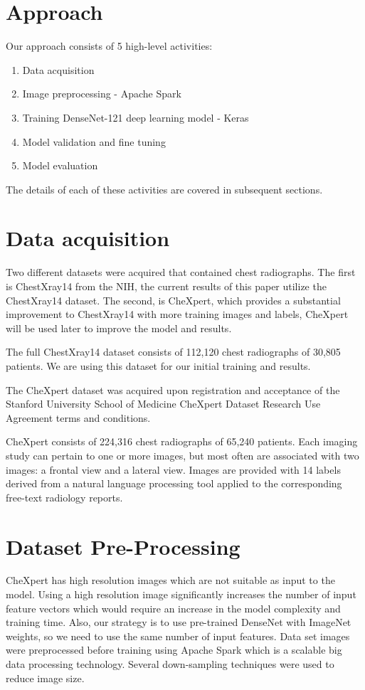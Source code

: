 \documentclass{amia}
\begin{document}
\section*{Approach}

Our approach consists of 5 high-level activities:
\begin{enumerate}
\item Data acquisition
\item Image preprocessing - Apache Spark
\item Training DenseNet-121 deep learning model - Keras
\item Model validation and fine tuning
\item Model evaluation
\end{enumerate}

The details of each of these activities are covered in subsequent sections.

\section*{Data acquisition}
Two different datasets were acquired that contained chest radiographs. The first is ChestXray14 from the NIH, the current results of this paper utilize the ChestXray14 dataset. The second, is CheXpert, which provides a substantial improvement to ChestXray14 with more training images and labels, CheXpert will be used later to improve the model and results.

The full ChestXray14 dataset consists of 112,120 chest radiographs of 30,805 patients. We are using this dataset for our initial training and results.

The CheXpert dataset was acquired upon registration and acceptance of the Stanford University School of Medicine CheXpert Dataset Research Use Agreement terms and conditions.\cite{ref2}

CheXpert consists of 224,316 chest radiographs of 65,240 patients. Each imaging study can pertain to one or more images, but most often are associated with two images: a frontal view and a lateral view. Images are provided with 14 labels derived from a natural language processing tool applied to the corresponding free-text radiology reports.


\section*{Dataset Pre-Processing}

CheXpert\cite{ref2} has high resolution images which are not suitable as input to the model. Using a high resolution image significantly increases the number of input feature vectors which would require an increase in the model complexity and training time. Also, our strategy is to use pre-trained DenseNet with ImageNet weights, so we need to use the same number of input features. Data set images were preprocessed before training using Apache Spark which is a scalable big data processing technology. Several down-sampling techniques were used to reduce image size.
\end{document}
